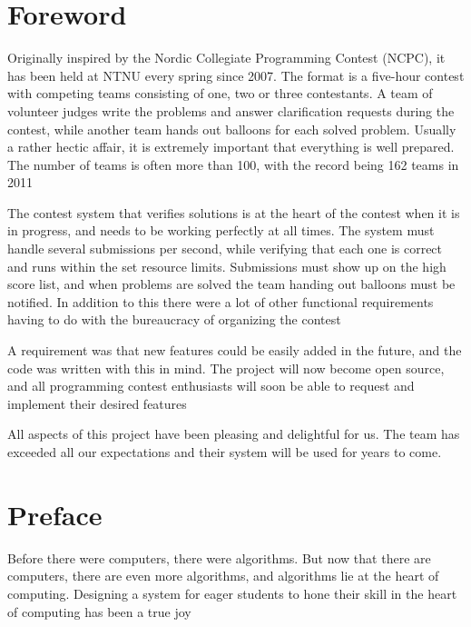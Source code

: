 \section{Foreword}
Originally inspired by the Nordic Collegiate Programming Contest (NCPC),
it has been held at NTNU every spring since 2007. The format is a
five-hour contest with competing teams consisting of one, two or three
contestants. A team of volunteer judges write the problems and answer
clarification requests during the contest, while another team hands out
balloons for each solved problem. Usually a rather hectic affair, it is
extremely important that everything is well prepared. The number of
teams is often more than 100, with the record being 162 teams in 2011

The contest system that verifies solutions is at the heart of the
contest when it is in progress, and needs to be working perfectly at
all times. The system must handle several submissions per second, while
verifying that each one is correct and runs within the set resource
limits. Submissions must show up on the high score list, and when
problems are solved the team handing out balloons must be notified. In
addition to this there were a lot of other functional requirements
having to do with the bureaucracy of organizing the contest


\bigskip


A requirement was that new features could be easily added in the future,
and the code was written with this in mind. The project will now become
open source, and all programming contest enthusiasts will soon be able
to request and implement their desired features


\bigskip


All aspects of this project have been pleasing and delightful for us.
The team has exceeded all our expectations and their system will be
used for years to come.

\pagebreak

\section{Preface}


Before there were computers, there were algorithms. But now that there
are computers, there are even more algorithms, and algorithms lie at
the heart of computing. Designing a system for eager students to hone
their skill in the heart of computing
has been a true joy


\bigskip


